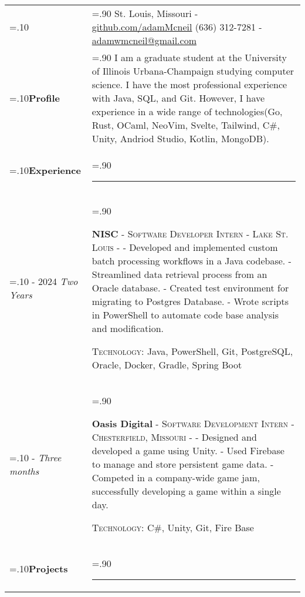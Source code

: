 \documentclass[10pt]{article}
\newcommand{\timeFrame}[3] {
  \if\relax\detokenize{#2}\relax
    #1
  \else
    #1 - #2
  \fi
  \newline
  \scriptsize \textit{#3}
}
\newcommand{\entry}[6] {
  \textbf{#1}
  \if\relax\detokenize{#2}\relax
  \else
       - \textsc{#2}
  \fi
  \if\relax\detokenize{#3}\relax
  \else
      - \textsc{#3}
  \fi
  \if\relax\detokenize{#4}\relax
  \else
      - \href{https://#4}{#4}
  \fi
  \newline #5
  \if\relax\detokenize{#6}\relax
  \else
      \newline \textsc{Technology:} #6
  \fi
  \\
}
\newcommand{\horizontalLine}[0] {
    \noindent\rule{.90\linewidth}{0.4pt}
}
\begin{document}

\begin{tabularx}{\linewidth}{>{\hsize=.10\hsize}X>{\hsize=.90\hsize}X}

{\bfseries\large Adam McNeil} &
St. Louis, Missouri - \href{https://github.com/adamMcneil}{github.com/adamMcneil}\newline
{(636) 312-7281 \hspace{5.5mm} - \href{mailto:adamwmcneil@gmail.com}{adamwmcneil@gmail.com}} \\[5pt]

\textbf{Profile} &
{
  I am a graduate student at the University of Illinois Urbana-Champaign studying computer science.
  I have the most professional experience with Java, SQL, and Git.
  However, I have experience in a wide range of technologies(Go, Rust, OCaml, NeoVim, Svelte, Tailwind, C\#, Unity, Andriod Studio, Kotlin, MongoDB).
 \newline
} \\

\textbf{Experience} & \horizontalLine \\

\timeFrame{2023}{2024}{Two Years} &
\entry{NISC}
  {Software Developer Intern}
  {Lake St. Louis}
  {}
  {
  - Developed and implemented custom batch processing workflows in a Java codebase. \newline
  - Streamlined data retrieval process from an Oracle database. \newline
  - Created test environment for migrating to Postgres Database. \newline
  - Wrote scripts in PowerShell to automate code base analysis and modification.
  }
  {Java, PowerShell, Git, PostgreSQL, Oracle, Docker, Gradle, Spring Boot \newline}

\timeFrame{2022}{}{Three months} &
\entry{Oasis Digital}
  {Software Development Intern}
  {Chesterfield, Missouri}
  {}
  {
  - Designed and developed a game using Unity. \newline
  - Used Firebase to manage and store persistent game data. \newline
  - Competed in a company-wide game jam, successfully developing a game within a single day.
  }
  {C\#, Unity, Git, Fire Base \newline}


\textbf{Projects} & \horizontalLine \\


\end{tabularx}
\end{document}
